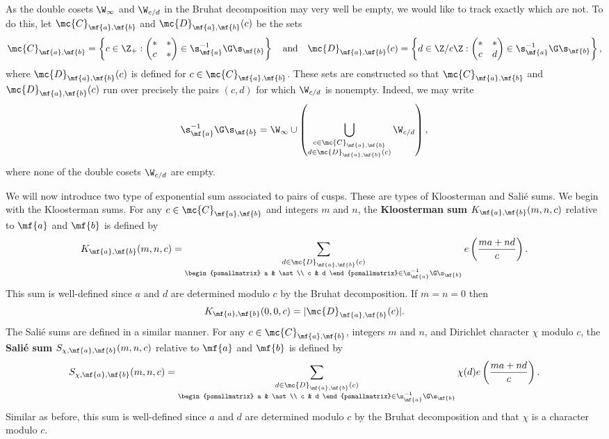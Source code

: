 \documentclass[12pt]{article}
\begin{document}
      As the double cosets \(\W_{\infty}\) and \(\W_{c/d}\) in the Bruhat decomposition may very well be empty, we would like to track exactly which are not. To do this, let \(\mc{C}_{\mf{a},\mf{b}}\) and \(\mc{D}_{\mf{a},\mf{b}}(c)\) be the sets
      \[
        \mc{C}_{\mf{a},\mf{b}} = \left\{c \in \Z_{+}:\begin{pmatrix} \ast & \ast \\ c & \ast \end{pmatrix} \in \s_{\mf{a}}^{-1}\G\s_{\mf{b}}\right\} \quad \text{and} \quad \mc{D}_{\mf{a},\mf{b}}(c) = \left\{d \in \Z/c\Z:\begin{pmatrix} \ast & \ast \\ c & d \end{pmatrix} \in \s_{\mf{a}}^{-1}\G\s_{\mf{b}}\right\},
      \]
      where \(\mc{D}_{\mf{a},\mf{b}}(c)\) is defined for \(c \in \mc{C}_{\mf{a},\mf{b}}\). These sets are constructed so that \(\mc{C}_{\mf{a},\mf{b}}\) and \(\mc{D}_{\mf{a},\mf{b}}(c)\) run over precisely the pairs \((c,d)\) for which \(\W_{c/d}\) is nonempty. Indeed, we may write
      \[
       \s_{\mf{a}}^{-1}\G\s_{\mf{b}} = \W_{\infty} \cup \left(\bigcup_{\substack{c \in \mc{C}_{\mf{a},\mf{b}} \\ d \in \mc{D}_{\mf{a},\mf{b}}(c)}}\W_{c/d}\right),
      \]
      where none of the double cosets \(\W_{c/d}\) are empty.

      We will now introduce two type of exponential sum associated to pairs of cusps. These are types of Kloosterman and Sali\'e sums. We begin with the Kloosterman sums. For any \(c \in \mc{C}_{\mf{a},\mf{b}}\) and integers \(m\) and \(n\), the \textbf{Kloosterman sum} \(K_{\mf{a},\mf{b}}(m,n,c)\) relative to \(\mf{a}\) and \(\mf{b}\) is defined by
      \[
        K_{\mf{a},\mf{b}}(m,n,c) = \sum_{\substack{d \in \mc{D}_{\mf{a},\mf{b}}(c) \\ \begin{psmallmatrix} a & \ast \\ c & d \end{psmallmatrix} \in \s_{\mf{a}}^{-1}\G\s_{\mf{b}}}}e\left(\frac{ma+nd}{c}\right).
      \]
      This sum is well-defined since \(a\) and \(d\) are determined modulo \(c\) by the Bruhat decomposition. If \(m = n = 0\) then
      \[
        K_{\mf{a},\mf{b}}(0,0,c) = |\mc{D}_{\mf{a},\mf{b}}(c)|.
      \]
      The Sali\'e sums are defined in a similar manner. For any \(c \in \mc{C}_{\mf{a},\mf{b}}\), integers \(m\) and \(n\), and Dirichlet character \(\chi\) modulo \(c\), the \textbf{Sali\'e sum} \(S_{\chi,\mf{a},\mf{b}}(m,n,c)\) relative to \(\mf{a}\) and \(\mf{b}\) is defined by
      \[
        S_{\chi,\mf{a},\mf{b}}(m,n,c) = \sum_{\substack{d \in \mc{D}_{\mf{a},\mf{b}}(c) \\ \begin{psmallmatrix} a & \ast \\ c & d \end{psmallmatrix} \in \s_{\mf{a}}^{-1}\G\s_{\mf{b}}}}\chi(d)e\left(\frac{ma+nd}{c}\right).
      \]
      Similar as before, this sum is well-defined since \(a\) and \(d\) are determined modulo \(c\) by the Bruhat decomposition and that \(\chi\) is a character modulo \(c\). 
\end{document}
